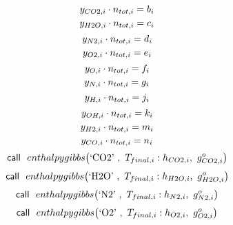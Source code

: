 \documentclass[10pt,fleqn]{article}
\newcommand{\F}[1]{\mbox{$#1$}}
\newcommand{\K}[1]{\mbox{\sf#1\ \ \mit}}
\newcommand{\SC}[1]{\mbox{`#1'}\  }
\newcommand{\I}{\mbox{\hspace{0.20in}}}
\begin{document}
\begin{equation}
\I \label{EES Eqn:27}
y_{CO2,i} \cdot  n_{tot,i} = b_{i} 
\end{equation}
\begin{equation}
\I \label{EES Eqn:28}
y_{H2O,i} \cdot  n_{tot,i} = c_{i} 
\end{equation}
\begin{equation}
\I \label{EES Eqn:29}
y_{N2,i} \cdot  n_{tot,i} = d_{i} 
\end{equation}
\begin{equation}
\I \label{EES Eqn:30}
y_{O2,i} \cdot  n_{tot,i} = e_{i} 
\end{equation}
\begin{equation}
\I \label{EES Eqn:31}
y_{O,i} \cdot  n_{tot,i} = f_{i} 
\end{equation}
\begin{equation}
\I \label{EES Eqn:32}
y_{N,i} \cdot  n_{tot,i} = g_{i} 
\end{equation}
\begin{equation}
\I \label{EES Eqn:33}
y_{H,i} \cdot  n_{tot,i} = j_{i} 
\end{equation}
\begin{equation}
\I \label{EES Eqn:34}
y_{OH,i} \cdot  n_{tot,i} = k_{i} 
\end{equation}
\begin{equation}
\I \label{EES Eqn:35}
y_{H2,i} \cdot  n_{tot,i} = m_{i} 
\end{equation}
\begin{equation}
\I \label{EES Eqn:36}
y_{CO,i} \cdot  n_{tot,i} = n_{i} 
\end{equation}
\begin{equation}
\I \label{EES Eqn:37}
\K{call} \F{enthalpygibbs}{ \left( \SC{CO2},\ T_{final,i} : h_{CO2,i} ,\ g^{o}_{CO2,i} \right) } 
\end{equation}
\begin{equation}
\I \label{EES Eqn:38}
\K{call} \F{enthalpygibbs}{ \left( \SC{H2O},\ T_{final,i} : h_{H2O,i} ,\ g^{o}_{H2O,i} \right) } 
\end{equation}
\begin{equation}
\I \label{EES Eqn:39}
\K{call} \F{enthalpygibbs}{ \left( \SC{N2},\ T_{final,i} : h_{N2,i} ,\ g^{o}_{N2,i} \right) } 
\end{equation}
\begin{equation}
\I \label{EES Eqn:40}
\K{call} \F{enthalpygibbs}{ \left( \SC{O2},\ T_{final,i} : h_{O2,i} ,\ g^{o}_{O2,i} \right) } 
\end{equation}
\end{document}

